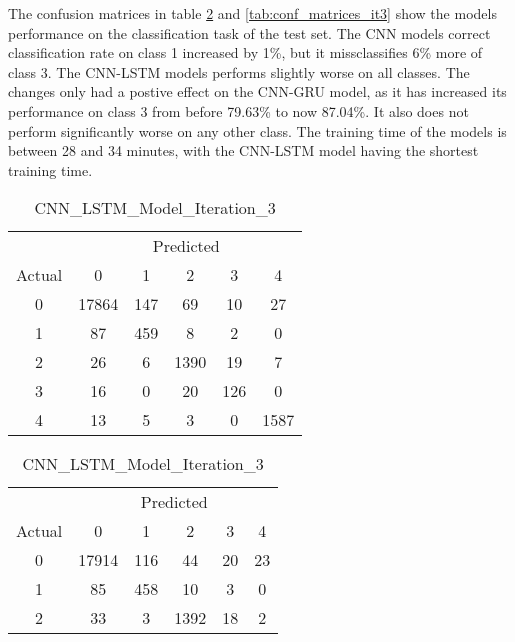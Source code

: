 The confusion matrices in table \ref{tab:conf_abs_it3} and \ref{tab:conf_matrices_it3} show the models performance on the classification task of the test set. The CNN models correct classification rate on class 1 increased by 1\%, but it missclassifies 6\% more of class 3. The CNN-LSTM models performs slightly worse on all classes. The changes only had a postive effect on the CNN-GRU model, as it has increased its performance on class 3 from before 79.63\% to now 87.04\%. It also does not perform significantly worse on any other class. The training time of the models is between 28 and 34 minutes, with the CNN-LSTM model having the shortest training time.

\begin{table}[ht]
    \centering
    \caption{Confusion Matrices with Absolute Values}
    \label{tab:conf_abs_it3}
    \begin{minipage}{0.32\textwidth}
        \caption*{CNN\_Model\_Iteration\_3}
        \begin{tabular}{cccccc}
            \toprule
            & \multicolumn{5}{c}{Predicted} \\
            \cmidrule(lr){2-6}
            Actual & 0 & 1 & 2 & 3 & 4 \\
            \midrule
            0 & 17864 & 147 & 69  & 10  & 27  \\
            1 & 87    & 459 & 8   & 2   & 0   \\
            2 & 26    & 6   & 1390& 19  & 7   \\
            3 & 16    & 0   & 20  & 126 & 0   \\
            4 & 13    & 5   & 3   & 0   & 1587\\
            \bottomrule
        \end{tabular}
    \end{minipage}
    \hfill
    \begin{minipage}{0.32\textwidth}
        \caption*{CNN\_LSTM\_Model\_Iteration\_3}
        \begin{tabular}{cccccc}
            \toprule
            & \multicolumn{5}{c}{Predicted} \\
            \cmidrule(lr){2-6}
            Actual & 0 & 1 & 2 & 3 & 4 \\
            \midrule
            0 & 17914 & 116 & 44  & 20  & 23  \\
            1 & 85    & 458 & 10  & 3   & 0   \\
            2 & 33    & 3   & 1392& 18  & 2   \\

\end{tabular}
\end{minipage}
\end{table}
